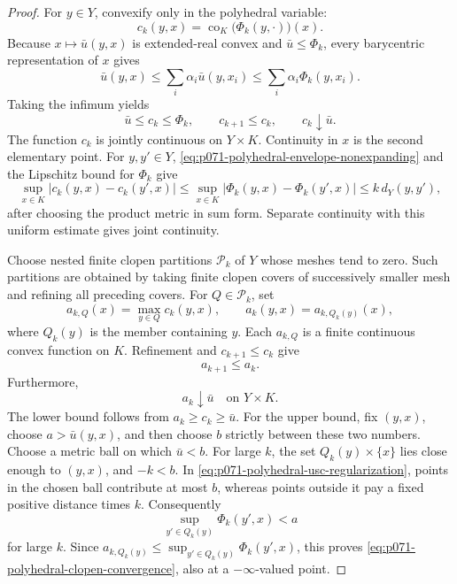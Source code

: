 \begin{proof}
For \(y\in Y\), convexify only in the polyhedral variable:
\begin{equation}
 c_k(y,x)
 =\operatorname{co}_K\bigl(\Phi_k(y,\cdot)\bigr)(x).
 \label{eq:p071-polyhedral-fibre-convexification}
\end{equation}
Because \(x\mapsto\bar u(y,x)\) is extended-real convex and
\(\bar u\leq\Phi_k\), every barycentric representation of \(x\) gives
\[
       \bar u(y,x)
       \leq\sum_i\alpha_i\bar u(y,x_i)
       \leq\sum_i\alpha_i\Phi_k(y,x_i).
\]
Taking the infimum yields
\begin{equation}
                     \bar u\leq c_k\leq\Phi_k,
        \qquad       c_{k+1}\leq c_k,
        \qquad       c_k\downarrow\bar u .
 \label{eq:p071-polyhedral-convexified-convergence}
\end{equation}
The function \(c_k\) is jointly continuous on \(Y\times K\).  Continuity
in \(x\) is the second elementary point.  For \(y,y'\in Y\),
\eqref{eq:p071-polyhedral-envelope-nonexpanding} and the Lipschitz bound
for \(\Phi_k\) give
\[
 \sup_{x\in K}|c_k(y,x)-c_k(y',x)|
 \leq
 \sup_{x\in K}|\Phi_k(y,x)-\Phi_k(y',x)|
 \leq k\,d_Y(y,y'),
\]
after choosing the product metric in sum form.  Separate continuity with
this uniform estimate gives joint continuity.

Choose nested finite clopen partitions \(\mathcal P_k\) of \(Y\) whose
meshes tend to zero.  Such partitions are obtained by taking finite clopen
covers of successively smaller mesh and refining all preceding covers.
For \(Q\in\mathcal P_k\), set
\begin{equation}
             a_{k,Q}(x)=\max_{y\in Q}c_k(y,x),
             \qquad
             a_k(y,x)=a_{k,Q_k(y)}(x),
 \label{eq:p071-polyhedral-clopen-envelope}
\end{equation}
where \(Q_k(y)\) is the member containing \(y\).  Each \(a_{k,Q}\) is a
finite continuous convex function on \(K\).  Refinement and
\(c_{k+1}\leq c_k\) give
\begin{equation}
                              a_{k+1}\leq a_k.
 \label{eq:p071-polyhedral-clopen-monotonicity}
\end{equation}
Furthermore,
\begin{equation}
                              a_k\downarrow\bar u
                              \quad\text{on }Y\times K.
 \label{eq:p071-polyhedral-clopen-convergence}
\end{equation}
The lower bound follows from \(a_k\geq c_k\geq\bar u\).  For the upper
bound, fix \((y,x)\), choose \(a>\bar u(y,x)\), and then choose
\(b\) strictly between these two numbers.  Choose a metric ball on which
\(\bar u<b\).  For large \(k\), the set \(Q_k(y)\times\{x\}\) lies close
enough to \((y,x)\), and \(-k<b\).  In
\eqref{eq:p071-polyhedral-usc-regularization}, points in the chosen ball
contribute at most \(b\), whereas points outside it pay a fixed positive
distance times \(k\).  Consequently
\[
       \sup_{y'\in Q_k(y)}\Phi_k(y',x)<a
\]
for large \(k\).  Since \(a_{k,Q_k(y)}\leq
\sup_{y'\in Q_k(y)}\Phi_k(y',x)\), this proves
\eqref{eq:p071-polyhedral-clopen-convergence}, also at a
\(-\infty\)-valued point.


\end{proof}
